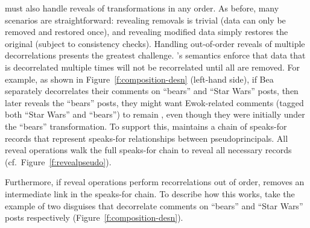 \sys must also handle reveals of transformations in any order.  As before,
many scenarios are straightforward: revealing removals is trivial (data can
only be removed and restored once), and revealing modified data simply restores
the original (subject to consistency checks).
%
Handling out-of-order reveals of multiple decorrelations presents the greatest
challenge.
%
\sys's semantics enforce that data that is decorrelated multiple times will not
be recorrelated until all \xxs are removed.
%
For example, as shown in Figure~\ref{f:composition-desn} (left-hand side), if Bea
separately decorrelates their comments on ``bears'' and ``Star Wars'' posts,
then later reveals the ``bears'' posts, they might want Ewok-related comments
(tagged both ``Star Wars'' and ``bears'') to remain \xxed, even though they were
initially \xxed under the ``bears'' transformation.
%
%
%
To support this, \sys maintains a chain of speaks-for records that represent
speaks-for relationships between pseudoprincipals.
%
All reveal operations walk the full speaks-for chain to reveal all necessary
records (cf.\ Figure~\ref{f:revealpseudo}).

Furthermore, if reveal operations perform recorrelations out of order, \sys
removes an intermediate link in the speaks-for chain.
%
To describe how this works, take the example of two disguises that decorrelate
comments on ``bears'' and ``Star Wars'' posts respectively
(Figure~\ref{f:composition-desn}). 

